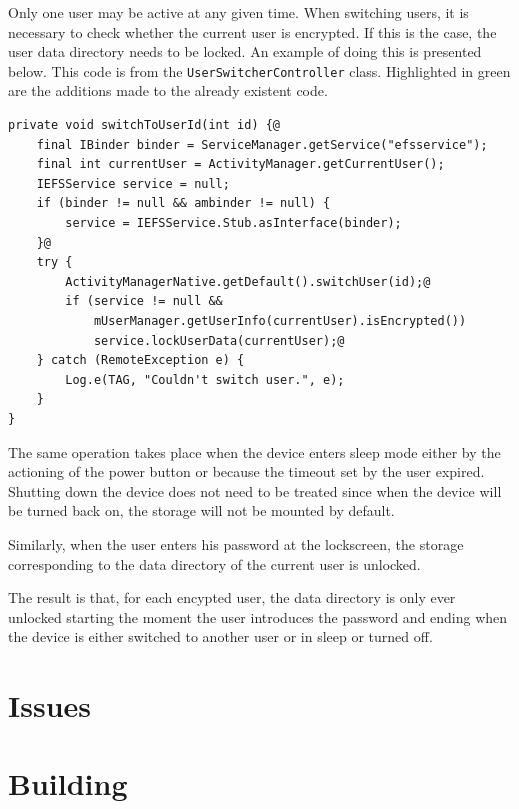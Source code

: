 Only one user may be active at any given time. When switching users, it is necessary to check whether the current user is encrypted. If this is the case, the user data directory needs to be locked. An example of doing this is presented below. This code is from the \texttt{UserSwitcherController} class. Highlighted in green are the additions made to the already existent code.


\begin{lstlisting}[style=custom]
private void switchToUserId(int id) {@
	final IBinder binder = ServiceManager.getService("efsservice");
	final int currentUser = ActivityManager.getCurrentUser();
	IEFSService service = null;
	if (binder != null && ambinder != null) {
		service = IEFSService.Stub.asInterface(binder);
	}@
	try {
		ActivityManagerNative.getDefault().switchUser(id);@
		if (service != null &&
		    mUserManager.getUserInfo(currentUser).isEncrypted())
			service.lockUserData(currentUser);@
	} catch (RemoteException e) {
		Log.e(TAG, "Couldn't switch user.", e);
	}
}
\end{lstlisting}

The same operation takes place when the device enters sleep mode either by the actioning of the power button or because the timeout set by the user expired. Shutting down the device does not need to be treated since when the device will be turned back on, the storage will not be mounted by default.

Similarly, when the user enters his password at the lockscreen, the storage corresponding to the data directory of the current user is unlocked.

The result is that, for each encypted user, the data directory is only ever unlocked starting the moment the user introduces the password and ending when the device is either switched to another user or in sleep or turned off.

\section{Issues}
\label{sec:issues-multi-user}


\section{Building}
\label{sec:build-multi-user}

